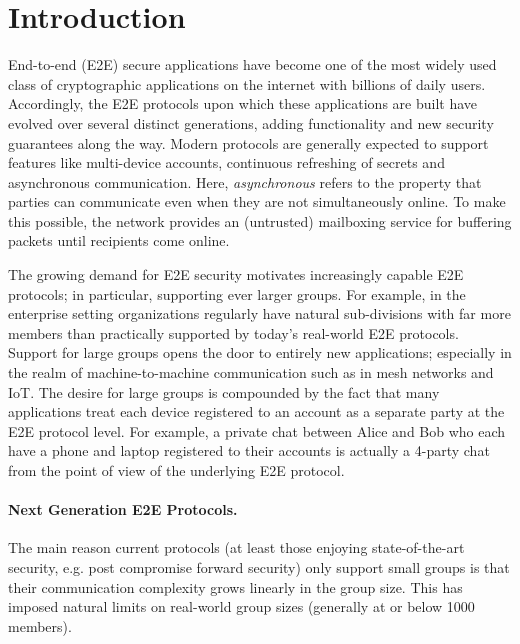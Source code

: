 
\section{Introduction}
End-to-end (E2E) secure applications have become one of the most widely used
class of cryptographic applications on the internet with billions of daily
users. Accordingly, the E2E protocols upon which these applications are built
have evolved over several distinct generations, adding functionality and new
security guarantees along the way. Modern protocols are generally expected to
support features like multi-device accounts, continuous refreshing of secrets
and asynchronous communication. Here, \emph{asynchronous} refers to the
property that parties can communicate even when they are not simultaneously
online. To make this possible, the network provides an (untrusted) mailboxing
service for buffering packets until recipients come online.

The growing demand for E2E security motivates increasingly capable E2E
protocols; in particular, supporting ever larger groups. For example, in the
enterprise setting organizations regularly have natural sub-divisions with
far more members than practically supported by today's real-world E2E
protocols. Support for large groups opens the door to entirely new
applications; especially in the realm of machine-to-machine communication
such as in mesh networks and IoT. The desire for large groups is compounded
by the fact that many applications treat each device registered to an account
as a separate party at the E2E protocol level. For example, a private chat
between Alice and Bob who each have a phone and laptop registered to their
accounts is actually a 4-party chat from the point of view of the underlying
E2E protocol.

\paragraph{Next Generation E2E Protocols.}
The main reason current protocols (at least those enjoying state-of-the-art
security, {e.g. post compromise forward security}) only support small groups
is that their communication complexity grows linearly in the group size. This
has imposed natural limits on real-world group sizes (generally at or below
1000 members).

